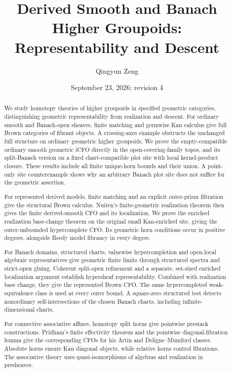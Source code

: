 \documentclass[12pt]{amsart}
\title[Derived smooth and Banach higher groupoids]
{Derived Smooth and Banach Higher Groupoids:\\
 Representability and Descent}
\author{Qingyun Zeng}
\date{September 23, 2026; revision 4}
\theoremstyle{definition}
\theoremstyle{remark}
\numberwithin{equation}{section}
\begin{document}
\begin{abstract}
We study homotopy theories of higher groupoids in
specified geometric categories, distinguishing geometric
representability from realization and descent.
For ordinary smooth and Banach-open sheaves, finite matching
and germwise Kan calculus give full Brown categories of
fibrant objects. A crossing-axes example obstructs the
unchanged full structure on ordinary geometric higher
groupoids. We prove the empty-compatible ordinary smooth
geometric iCFO directly in the open-covering-family topos,
and its split-Banach version on a fixed chart-compatible
plot site with local kernel-product closure. These results include
all finite unique-horn bounds and their union. A point-only
site counterexample shows why an arbitrary Banach plot site
does not suffice for the geometric assertion.

For represented derived models, finite matching and an
explicit outer-prism filtration give the structural Brown
calculus. Nuiten's finite-geometric realization theorem
then gives the finite derived-smooth CFO and its
localization. We prove the enriched realization base-change
theorem on the original small Kan-enriched site, giving
the outer-unbounded hypercomplete CFO. Its geometric horn
conditions occur in positive degrees, alongside Reedy model
fibrancy in every degree.

For Banach domains, structured charts, valuewise
hypercompletion and open-local algebraic representatives
give geometric finite limits through structured spectra
and strict-open gluing. Coherent split-open
refinement and a separate, set-sized enriched localization
argument establish hypersheaf representability. Combined with
realization base change, they give the represented Brown CFO.
The same hypercompleted weak-equivalence class is used
at every outer bound. A square-zero structured test detects
nonordinary self-intersections of the chosen Banach charts,
including infinite-dimensional charts.

For connective associative affines, homotopy split horns
give pointwise prestack constructions. Pridham's finite
effectivity theorem and the pointwise diagonal-fibration
lemma give the corresponding CFOs for his Artin and
Deligne--Mumford classes. Absolute horns ensure Kan
diagonal objects, while relative horns control fibrations.
The associative theory uses quasi-isomorphisms of algebras
and realization in presheaves.
\end{abstract}

\maketitle
\clearpage
\tableofcontents
\end{document}
